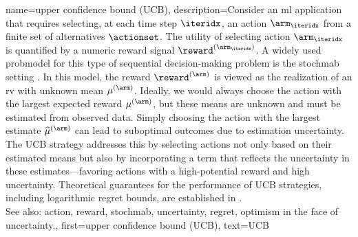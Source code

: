 {name={upper confidence bound (UCB)},
	description={Consider an \gls{ml} 
		application that requires selecting, at each time step $\iteridx$, an \gls{action} $\arm_{\iteridx}$ 
		from a finite set of alternatives $\actionset$. The utility of selecting \gls{action} $\arm_{\iteridx}$ 
		is quantified by a numeric \gls{reward} signal $\reward^{(\arm_{\iteridx})}$. 
		A widely used \gls{probmodel} for this type of sequential decision-making problem 
		is the \gls{stochmab} setting \cite{Bubeck2012}. In this \gls{model}, 
		the \gls{reward} $\reward^{(\arm)}$ is viewed as the \gls{realization} of an \gls{rv} 
		with unknown \gls{mean} $\mu^{(\arm)}$. Ideally, we would always choose the 
		\gls{action} with the largest expected \gls{reward} $\mu^{(\arm)}$, but these 
		\glspl{mean} are unknown and must be estimated from observed \gls{data}. Simply 
		choosing the \gls{action} with the largest estimate $\widehat{\mu}^{(\arm)}$ can 
		lead to suboptimal \glspl{outcome} due to estimation \gls{uncertainty}. The UCB strategy 
		addresses this by selecting \glspl{action} not only based on their estimated \glspl{mean} but 
		also by incorporating a term that reflects the \gls{uncertainty} in these estimates—favoring 
		\glspl{action} with a high-potential \gls{reward} and high \gls{uncertainty}. Theoretical guarantees 
		for the performance of UCB strategies, including logarithmic \gls{regret} bounds, are established in \cite{Bubeck2012}.
					\\ 
		See also: \gls{action}, \gls{reward}, \gls{stochmab}, \gls{uncertainty}, \gls{regret}, \gls{optimism in the face of uncertainty}.},
	first={upper confidence bound (UCB)},
	text={UCB} 
}

